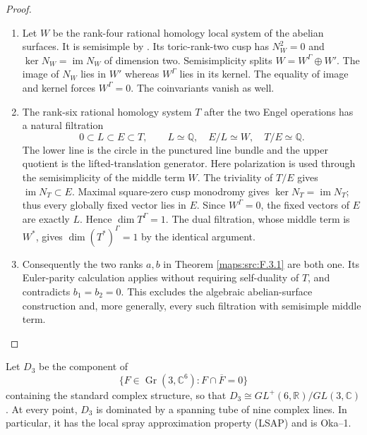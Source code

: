 \begin{proof}
\begin{enumerate}[label={$\langle1\rangle$\arabic*.}]
\item Let $W$ be the rank-four rational homology local system of the
abelian surfaces.  It is semisimple by
\cite[Definition 4.2.4 and Proposition 4.2.5, p.~44; Theorem 4.2.6, p.~45]{ffDeligne}.
Its toric-rank-two cusp has
$N_W^2=0$ and $\ker N_W=\operatorname{im}N_W$ of dimension two.
Semisimplicity splits $W=W^\Gamma\oplus W'$.
The image of $N_W$ lies in $W'$ whereas $W^\Gamma$ lies in its
kernel.  The equality of image and kernel forces $W^\Gamma=0$.
The coinvariants vanish as well.

\item The rank-six rational homology system $T$ after the two Engel
operations has a natural filtration
\[
 0\subset L\subset E\subset T,\qquad
 L\simeq\mathbb Q,\quad E/L\simeq W,\quad T/E\simeq\mathbb Q.
\]
The lower line is the circle in the punctured line bundle and
the upper quotient is the lifted-translation generator.
Here polarization is used through the semisimplicity of the middle term $W$.
The triviality of $T/E$ gives $\operatorname{im}N_T\subset E$.
Maximal square-zero cusp monodromy gives
$\ker N_T=\operatorname{im}N_T$; thus every globally fixed vector
lies in $E$.  Since $W^\Gamma=0$, the fixed vectors of $E$ are
exactly $L$.  Hence $\dim T^\Gamma=1$.
The dual filtration, whose middle term is $W^*$, gives
$\dim(T^*)^\Gamma=1$ by the identical argument.

\item Consequently the two ranks $a,b$ in Theorem \ref{maps:src:F.3.1} are both one.
Its Euler-parity calculation applies without requiring self-duality
of $T$, and contradicts $b_1=b_2=0$.
This excludes the algebraic abelian-surface construction and,
more generally, every such filtration with semisimple middle term.

\end{enumerate}
\end{proof}




\begin{theorem}\hypertarget{tag-02OA}{}\label{maps:src:F.3.8}


Let $D_3$ be the component of
\[
 \{F\in\operatorname{Gr}(3,\mathbb C^6):F\cap\overline F=0\}
\]
containing the standard complex structure, so that
$D_3\cong GL^+(6,\mathbb R)/GL(3,\mathbb C)$.
At every point, $D_3$
is dominated by a spanning tube of nine complex lines.  In particular,
it has the local spray approximation property (LSAP) and is Oka--1.

\end{theorem}



